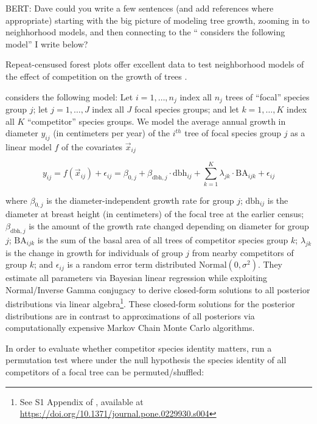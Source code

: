 \documentclass[12pt]{article}
\begin{document}
BERT: Dave could you write a few sentences (and add references where
appropriate) starting with the big picture of modeling tree growth,
zooming in to neighhorhood models, and then connecting to the
``\citet{allen_permutation_2020} considers the following model'' I write
below?

Repeat-censused forest plots offer excellent data to test neighborhood
models of the effect of competition on the growth of trees
\citet{canham_neighborhood_2006} \citet{uriarte_spatially_2004}.

\citet{allen_permutation_2020} considers the following model: Let
\(i = 1, \ldots, n_j\) index all \(n_j\) trees of ``focal'' species
group \(j\); let \(j = 1, \ldots, J\) index all \(J\) focal species
groups; and let \(k = 1, \ldots, K\) index all \(K\) ``competitor''
species groups. We model the average annual growth in diameter
\(y_{ij}\) (in centimeters per year) of the \(i^{th}\) tree of focal
species group \(j\) as a linear model \(f\) of the covariates
\(\vec{x}_{ij}\)

\begin{equation}
\label{eq:model}
y_{ij} = f(\vec{x}_{ij}) + \epsilon_{ij} = \beta_{0,j} + \beta_{\text{dbh},j} \cdot \text{dbh}_{ij} + \sum_{k=1}^{K} \lambda_{jk} \cdot \text{BA}_{ijk} + \epsilon_{ij}
\end{equation}

where \(\beta_{0,j}\) is the diameter-independent growth rate for group
\(j\); \(\text{dbh}_{ij}\) is the diameter at breast height (in
centimeters) of the focal tree at the earlier census;
\(\beta_{\text{dbh},j}\) is the amount of the growth rate changed
depending on diameter for group \(j\); \(\text{BA}_{ijk}\) is the sum of
the basal area of all trees of competitor species group \(k\);
\(\lambda_{jk}\) is the change in growth for individuals of group \(j\)
from nearby competitors of group \(k\); and \(\epsilon_{ij}\) is a
random error term distributed \(\text{Normal}(0, \sigma^2)\). They
estimate all parameters via Bayesian linear regression while exploiting
Normal/Inverse Gamma conjugacy to derive closed-form solutions to all
posterior distributions via linear algebra\footnote{See S1 Appendix of
  \citet{allen_permutation_2020}, available at
  \url{https://doi.org/10.1371/journal.pone.0229930.s004}}. These
closed-form solutions for the posterior distributions are in contrast to
approximations of all posteriors via computationally expensive Markov
Chain Monte Carlo algorithms.

In order to evaluate whether competitor species identity matters,
\citet{allen_permutation_2020} run a permutation test where under the
null hypothesis the species identity of all competitors of a focal tree
can be permuted/shuffled:
\end{document}
